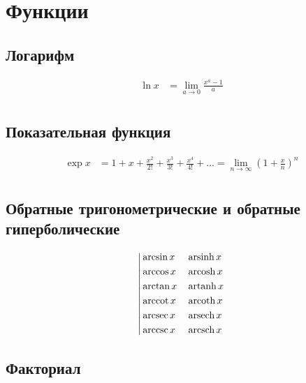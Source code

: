 
\section{Функции}

\subsection{Логарифм}

\begin{equation*} \begin{aligned}
\ln{x} &= \lim_{a \to 0} \frac{x^a - 1}{a} \\
\end{aligned} \end{equation*}

\subsection{Показательная функция}

\begin{equation*}
\begin{aligned}
\exp{x} &= 
  1
+ x
+ \frac{x^2}{2!}
+ \frac{x^3}{3!}
+ \frac{x^4}{4!}
+ \ldots
= \lim_{n \to \infty} \left(
  1 + \frac{x}{n}
  \right)^n \\
\end{aligned}
\end{equation*}

\subsection{Обратные тригонометрические и обратные гиперболические}

\begin{equation*}
\left|
\begin{aligned}
&\arcsin{x} & &\operatorname{arsinh}{x} \\
&\arccos{x} & &\operatorname{arcosh}{x} \\
&\arctan{x} & &\operatorname{artanh}{x} \\
&\operatorname{arccot}{x} & &\operatorname{arcoth}{x} \\
&\operatorname{arcsec}{x} & &\operatorname{arsech}{x} \\
&\operatorname{arccsc}{x} & &\operatorname{arcsch}{x} \\
\end{aligned}
\right.
\end{equation*}

\subsection{Факториал}

